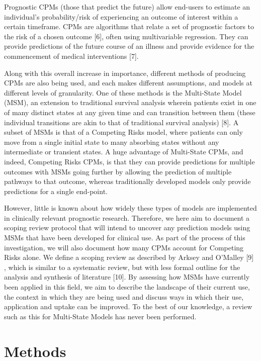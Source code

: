 \documentclass[12pt,PhD,twoside,openright]{muthesis}
\begin{document}
Prognostic CPMs (those that predict the future) allow end-users to estimate an individual's probability/risk of experiencing an outcome of interest within a certain timeframe. CPMs are algorithms that relate a set of prognostic factors to the risk of a chosen outcome {[}6{]}, often using multivariable regression. They can provide predictions of the future course of an illness and provide evidence for the commencement of medical interventions {[}7{]}.

Along with this overall increase in importance, different methods of producing CPMs are also being used, and each makes different assumptions, and models at different levels of granularity. One of these methods is the Multi-State Model (MSM), an extension to traditional survival analysis wherein patients exist in one of many distinct states at any given time and can transition between them (these individual transitions are akin to that of traditional survival analysis) {[}8{]}. A subset of MSMs is that of a Competing Risks model, where patients can only move from a single initial state to many absorbing states without any intermediate or transient states. A huge advantage of Multi-State CPMs, and indeed, Competing Risks CPMs, is that they can provide predictions for multiple outcomes with MSMs going further by allowing the prediction of multiple pathways to that outcome, whereas traditionally developed models only provide predictions for a single end-point.

However, little is known about how widely these types of models are implemented in clinically relevant prognostic research. Therefore, we here aim to document a scoping review protocol that will intend to uncover any prediction models using MSMs that have been developed for clinical use. As part of the process of this investigation, we will also document how many CPMs account for Competing Risks alone. We define a scoping review as described by Arksey and O'Malley {[}9{]} , which is similar to a systematic review, but with less formal outline for the analysis and synthesis of literature {[}10{]}. By assessing how MSMs have currently been applied in this field, we aim to describe the landscape of their current use, the context in which they are being used and discuss ways in which their use, application and uptake can be improved. To the best of our knowledge, a review such as this for Multi-State Models has never been performed.

\hypertarget{methods}{%
\section{Methods}\label{methods}}
\end{document}
